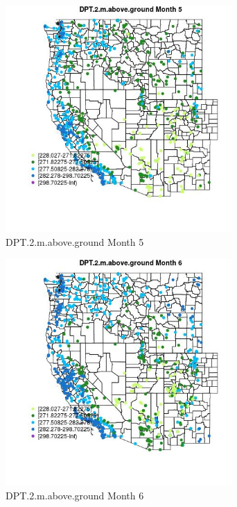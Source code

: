 \begin{figure} 
\centering  
\includegraphics[width=0.77\textwidth]{Code_Outputs/Report_ML_input_PM25_Step4_part_f_de_duplicated_aveswNAs_MapObsMo5DPT2maboveground.jpg} 
\caption{\label{fig:Report_ML_input_PM25_Step4_part_f_de_duplicated_aveswNAsMapObsMo5DPT2maboveground}DPT.2.m.above.ground Month 5} 
\end{figure} 
 

\begin{figure} 
\centering  
\includegraphics[width=0.77\textwidth]{Code_Outputs/Report_ML_input_PM25_Step4_part_f_de_duplicated_aveswNAs_MapObsMo6DPT2maboveground.jpg} 
\caption{\label{fig:Report_ML_input_PM25_Step4_part_f_de_duplicated_aveswNAsMapObsMo6DPT2maboveground}DPT.2.m.above.ground Month 6} 
\end{figure} 
 

